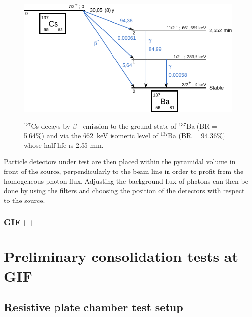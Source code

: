 				\begin{figure}[!h]
				\begin{center}
					\includegraphics[width = \plotwidth]{fig/Cs137.pdf}\\
					\caption{\label{fig:CsSource} $^{137}$Cs decays by $\beta^-$ emission to the ground state of $^{137}$Ba (BR = 5.64\%) and via the \SI{662}{\keV} isomeric level of $^{137}$Ba (BR = 94.36\%) whose half-life is 2.55 min.}
				\end{center}
			\end{figure}
			
			Particle detectors under test are then placed within the pyramidal volume in front of the source, perpendicularly to the beam line in order to profit from the homogeneous photon flux. Adjusting the background flux of photons can then be done by using the filters and choosing the position of the detectors with respect to the source.
			
		
		\subsubsection{GIF++}
		\label{sssec:GIF++}
		
		

\section{Preliminary consolidation tests at GIF}
\label{sec:GIFtests}
				
	\subsection{Resistive plate chamber test setup}
	\label{ssec:RPCSetup}
	
